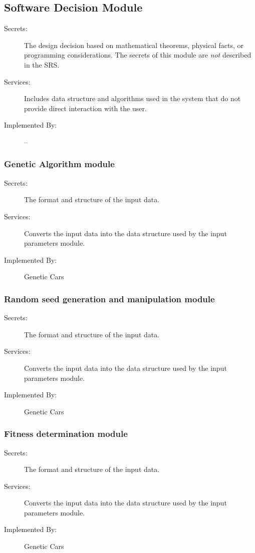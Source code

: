 \documentclass[12pt, titlepage]{article}
\begin{document}
\subsection{Software Decision Module}

\begin{description}
\item[Secrets:] The design decision based on mathematical theorems, physical
  facts, or programming considerations. The secrets of this module are
  \emph{not} described in the SRS.
\item[Services:] Includes data structure and algorithms used in the system that
  do not provide direct interaction with the user. 
\item[Implemented By:] --
\end{description}

\subsubsection{Genetic Algorithm module}

\begin{description}
\item[Secrets:]The format and structure of the input data.
\item[Services:]Converts the input data into the data structure used by the
  input parameters module.
\item[Implemented By:] Genetic Cars
\end{description}

\subsubsection{Random seed generation and manipulation module}

\begin{description}
\item[Secrets:]The format and structure of the input data.
\item[Services:]Converts the input data into the data structure used by the
  input parameters module.
\item[Implemented By:] Genetic Cars
\end{description}

\subsubsection{Fitness determination module}

\begin{description}
\item[Secrets:]The format and structure of the input data.
\item[Services:]Converts the input data into the data structure used by the
  input parameters module.
\item[Implemented By:] Genetic Cars
\end{description}
\end{document}
